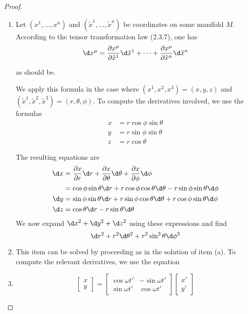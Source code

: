 \begin{proof}\leavevmode\let\qed\relax
    \begin{enumerate}[label=(\alph*)]
        \item Let $( x^1, \ldots , x^n) $ and $( \tilde{x} ^1, \ldots , \tilde{x}^n) $ be coordinates on some manifold $M$. According to the tensor transformation law (2.3.7), one has
        \[
        \d x^\mu=\pdv{x^\mu}{\tilde{x}^1}\d\tilde{x}^1+\cdots+\pdv{x^\mu}{\tilde{x}^n}\d\tilde{x}^n
        \]
         
        as should be.

        We apply this formula in the case where $(x^1,x^2,x^3)=(x,y,z)$ and $(\tilde{x}^1,\tilde{x}^2,\tilde{x}^3)=(r,\theta,\phi)$. To compute the derivatives involved, we use the formulas
        \[\begin{aligned}
            x&=r\cos\phi\sin\theta\\
            y&=r\sin\phi\sin\theta\\
            z&=r\cos\theta
        \end{aligned}
        \]
        
        The resulting equations are
        \[
            \begin{aligned}
            \d x&=\pdv xr\d r+\pdv x\theta\d\theta+\pdv x\phi\d\phi\\
            &=\cos\phi\sin\theta\d r+r\cos\phi\cos\theta\d\theta-r\sin\phi\sin\theta\d\phi\\
            \d y&=\sin\phi\sin\theta\d r+r\sin\phi\cos\theta\d\theta+r\cos\phi\sin\theta\d\phi\\
            \d z&=\cos\theta\d r-r\sin\theta\d\theta
            \end{aligned}
        \]
        We now expand $\d x^2+\d y^2+\d z^2$ using these expressions and find
        \[
        \d r^2+r^2\d\theta^2+r^2\sin^2\theta\d\phi^2
        \]
        \item This item can be solved by proceeding as in the solution of item (a). To compute the relevant derivatives, we use the equation
        \item 
        \[\begin{bmatrix}
            x\\y
        \end{bmatrix}=
        \begin{bmatrix}
            \cos\omega t'&-\sin\omega t'\\
            \sin\omega t'&\cos\omega t'
        \end{bmatrix}
        \begin{bmatrix}
            x'\\y'
        \end{bmatrix}\]


\end{enumerate}
\end{proof}
